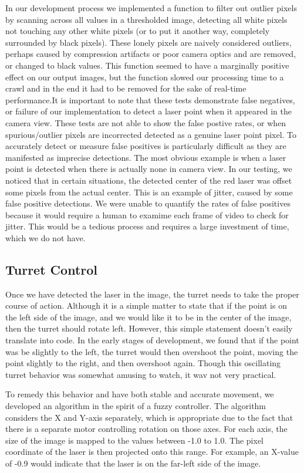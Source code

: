 \documentclass[10pt,twocolumn,letterpaper]{article}
\begin{document}
In our development process we implemented a function to filter out outlier pixels by scanning across all values in a thresholded image, detecting all white pixels not touching any other white pixels (or to put it another way, completely surrounded by black pixels).  These lonely pixels are naively considered outliers, perhaps caused by compression artifacts or poor camera optics and are removed, or changed to black values.  This function seemed to have a marginally positive effect on our output images, but the function slowed our processing time to a crawl and in the end it had to be removed for the sake of real-time performance.It is important to note that these tests demonstrate false negatives, or failure of our implementation to detect a laser point when it appeared in the camera view.  These tests are not able to show the false postive rates, or when spurious/outlier pixels are incorrected detected as a genuine laser point pixel.  To accurately detect or measure false positives is particularly difficult as they are manifested as imprecise detections.  The most obvious example is when a laser point is detected when there is actually none in camera view.  In our testing, we noticed that in certain situations, the detected center of the red laser was offset some pixels from the actual center.  This is an example of jitter, caused by some false positive detections.  We were unable to quantify the rates of false positives because it would require a human to examime each frame of video to check for jitter.  This would be a tedious process and requires a large investment of time, which we do not have.

\subsection{Turret Control}

Once we have detected the laser in the image, the turret needs to take the proper course of action. Although it is a  simple matter to state that if the point is on the left side of the image, and we would like it to be in the center of the image, then the turret should rotate left. However, this simple statement doesn't easily translate into code.  In the early stages of development, we found that if the point was be slightly to the left, the turret would then overshoot the point, moving the point slightly to the right, and then overshoot again. Though this oscillating turret behavior was somewhat amusing to watch, it wav not very practical.

To remedy this behavior and have both stable and accurate movement, we developed an algorithm in the spirit of a fuzzy controller. The algorithm considers the X and Y-axis separately, which is appropriate due to the fact that there is a separate motor controlling rotation on those axes. For each axis, the size of the image is mapped to the values between -1.0 to 1.0. The pixel coordinate of the laser is then projected onto this range. For example, an X-value of -0.9 would indicate that the laser is on the far-left side of the image.
\end{document}

